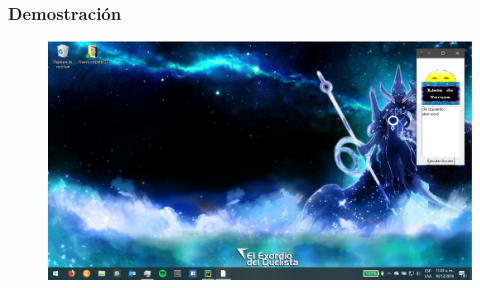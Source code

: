 \begin{frame}
\frametitle{Demostraci\'on}
\begin{figure}[H]
\centering
\includegraphics[width=1.0\columnwidth]{Imagenes/8.eps}
\end{figure}
\end{frame}

